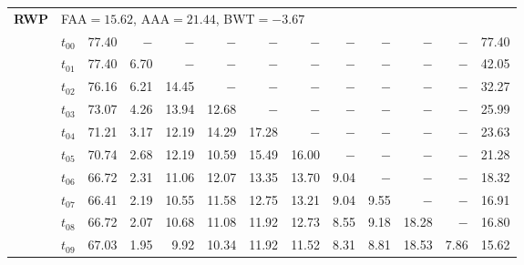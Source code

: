 \begin{table}[ht]
\begin{tabular}{@{}l l r r r r r r r r r r r@{}}
\midrule
\multirow{11}{*}{\textbf{RWP}} & \multicolumn{12}{l}{\quad\small FAA$=15.62$,\; AAA$=21.44$,\; BWT$=-3.67$} \\
 & $t_{00}$ & 77.40 & $-$ & $-$ & $-$ & $-$ & $-$ & $-$ & $-$ & $-$ & $-$ & 77.40 \\
 & $t_{01}$ & 77.40 & 6.70 & $-$ & $-$ & $-$ & $-$ & $-$ & $-$ & $-$ & $-$ & 42.05 \\
 & $t_{02}$ & 76.16 & 6.21 & 14.45 & $-$ & $-$ & $-$ & $-$ & $-$ & $-$ & $-$ & 32.27 \\
 & $t_{03}$ & 73.07 & 4.26 & 13.94 & 12.68 & $-$ & $-$ & $-$ & $-$ & $-$ & $-$ & 25.99 \\
 & $t_{04}$ & 71.21 & 3.17 & 12.19 & 14.29 & 17.28 & $-$ & $-$ & $-$ & $-$ & $-$ & 23.63 \\
 & $t_{05}$ & 70.74 & 2.68 & 12.19 & 10.59 & 15.49 & 16.00 & $-$ & $-$ & $-$ & $-$ & 21.28 \\
 & $t_{06}$ & 66.72 & 2.31 & 11.06 & 12.07 & 13.35 & 13.70 & 9.04 & $-$ & $-$ & $-$ & 18.32 \\
 & $t_{07}$ & 66.41 & 2.19 & 10.55 & 11.58 & 12.75 & 13.21 & 9.04 & 9.55 & $-$ & $-$ & 16.91 \\
 & $t_{08}$ & 66.72 & 2.07 & 10.68 & 11.08 & 11.92 & 12.73 & 8.55 & 9.18 & 18.28 & $-$ & 16.80 \\
 & $t_{09}$ & 67.03 & 1.95 & 9.92 & 10.34 & 11.92 & 11.52 & 8.31 & 8.81 & 18.53 & 7.86 & 15.62 \\
\bottomrule
\end{tabular}
\end{table}

